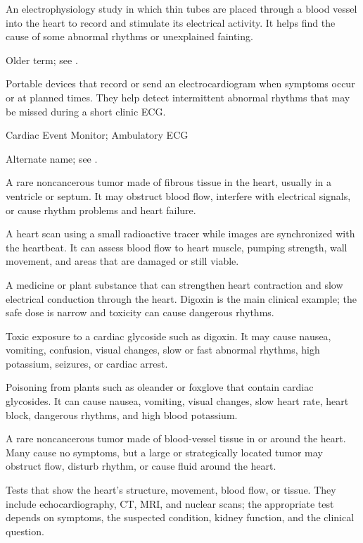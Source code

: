  An electrophysiology study in which thin tubes are placed through a blood vessel into the heart to record and stimulate its electrical activity. It helps find the cause of some abnormal rhythms or unexplained fainting.

 Older term; see .

 Portable devices that record or send an electrocardiogram when symptoms occur or at planned times. They help detect intermittent abnormal rhythms that may be missed during a short clinic ECG.

\synonyms
Cardiac Event Monitor; Ambulatory ECG

 Alternate name; see .

 A rare noncancerous tumor made of fibrous tissue in the heart, usually in a ventricle or septum. It may obstruct blood flow, interfere with electrical signals, or cause rhythm problems and heart failure.

 A heart scan using a small radioactive tracer while images are synchronized with the heartbeat. It can assess blood flow to heart muscle, pumping strength, wall movement, and areas that are damaged or still viable.

 A medicine or plant substance that can strengthen heart contraction and slow electrical conduction through the heart. Digoxin is the main clinical example; the safe dose is narrow and toxicity can cause dangerous rhythms.

 Toxic exposure to a cardiac glycoside such as digoxin. It may cause nausea, vomiting, confusion, visual changes, slow or fast abnormal rhythms, high potassium, seizures, or cardiac arrest.

 Poisoning from plants such as oleander or foxglove that contain cardiac glycosides. It can cause nausea, vomiting, visual changes, slow heart rate, heart block, dangerous rhythms, and high blood potassium.

 A rare noncancerous tumor made of blood-vessel tissue in or around the heart. Many cause no symptoms, but a large or strategically located tumor may obstruct flow, disturb rhythm, or cause fluid around the heart.

 Tests that show the heart's structure, movement, blood flow, or tissue. They include echocardiography, CT, MRI, and nuclear scans; the appropriate test depends on symptoms, the suspected condition, kidney function, and the clinical question.

